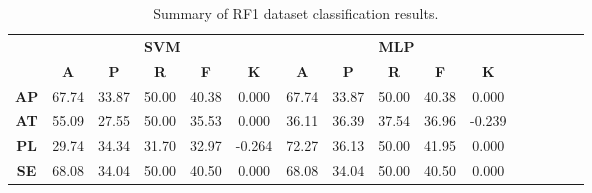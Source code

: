 \begin{landscape}
\begin{table}[htbp]
\footnotesize
\centering
\caption{Summary of RF1 dataset classification results.}
\label{tab:base_female}
\begin{tabular}{|c|c|c|c|c|c|c|c|c|c|c|c|c|c|c|c|}
\hline
\multirow{2}{*}{}	& \multicolumn{5}{c|}{\textbf{SVM}}												& \multicolumn{5}{c|}{\textbf{MLP}}												\\ \cline{2-11} 
					& \textbf{A}	& \textbf{P}	& \textbf{R}	& \textbf{F}	& \textbf{K}	& \textbf{A}	& \textbf{P}	& \textbf{R}	& \textbf{F}	& \textbf{K}	\\ \hline
\textbf{AP}			& 67.74			& 33.87			& 50.00			& 40.38			& 0.000			& 67.74			& 33.87			& 50.00			& 40.38			& 0.000			\\ \hline
\textbf{AT}			& 55.09			& 27.55			& 50.00			& 35.53			& 0.000			& 36.11			& 36.39			& 37.54			& 36.96			& -0.239			\\ \hline
\textbf{PL}			& 29.74			& 34.34			& 31.70			& 32.97			& -0.264			& 72.27			& 36.13			& 50.00			& 41.95			& 0.000			\\ \hline
\textbf{SE}			& 68.08			& 34.04			& 50.00			& 40.50			& 0.000			& 68.08			& 34.04			& 50.00			& 40.50			& 0.000			\\ \hline
\end{tabular}
\end{table}
\end{landscape}